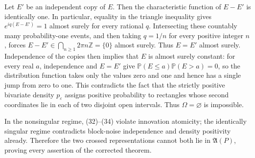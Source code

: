 Let \(E'\) be an independent copy of \(E\).  Then the characteristic function of \(E-E'\) is identically one.  In particular, equality in the triangle inequality gives \(e^{iq(E-E')}=1\) almost surely for every rational \(q\).  Intersecting these countably many probability-one events, and then taking \(q=1/n\) for every positive integer \(n\), forces \(E-E'\in\bigcap_{n\ge1}2\pi n\mathbb Z=\{0\}\) almost surely.  Thus \(E=E'\) almost surely.  Independence of the copies then implies that \(E\) is almost surely constant: for every real \(a\), independence and \(E=E'\) give \(\mathbb P(E\le a)\mathbb P(E>a)=0\), so the distribution function takes only the values zero and one and hence has a single jump from zero to one.  This contradicts the fact that the strictly positive bivariate density \(p_\varepsilon\) assigns positive probability to rectangles whose second coordinates lie in each of two disjoint open intervals.  Thus \(\Omega=\varnothing\) is impossible.

In the nonsingular regime, (32)--(34) violate innovation atomicity; the identically singular regime contradicts block-noise independence and density positivity already.  Therefore the two crossed representations cannot both lie in \(\mathfrak A(P)\), proving every assertion of the corrected theorem.
